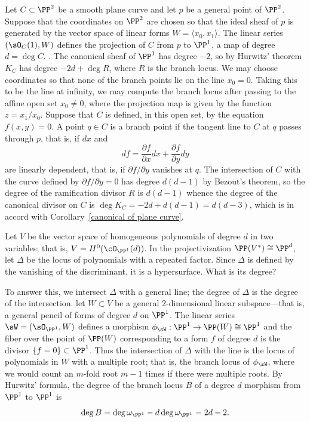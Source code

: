 \begin{example}
Let $C\subset \PP^2$ be a smooth plane curve and let $p$ be a general point of $\PP^2$. Suppose that the coordinates on $\PP^2$ are chosen so that the ideal sheaf of $p$ is  
 generated by the vector space of linear forms $W = \langle x_0,x_1\rangle$. 
The linear series $(\sO_C(1), W)$ defines the projection of $C$ from $p$ to $\PP^1$, a map of degree
$d = \deg C$.
. The canonical sheaf of $\PP^1$ has degree $-2$, so by Hurwitz' theorem
$K_C$ has degree $ -2d+ \deg R$, where $R$ is the branch locus. We may choose coordinates
so that none of the branch points lie on the line $x_0 = 0$. Taking this to be the line at infinity, we
may compute the branch locus after passing to the affine open set $x_0\neq 0$, where the projection
map is given by the function $z = x_1/x_0$.  Suppose that $C$ is defined, in this open set,
by the equation $f(x,y)= 0$. A point $q\in C$ is a branch point if the tangent line to $C$ at $q$
passes through $p$, that is, if $dx$  and 
$$
df = \frac{\partial f}{\partial x} dx + \frac{\partial f}{\partial y} dy
$$
are linearly dependent, that is, if $\partial f/{\partial y}$ vanishes at $q$. The intersection of 
$C$ with the curve defined by $\partial f/{\partial y}=0$ has degree $d(d-1)$ by Bezout's theorem,
so the degree of the ramification divisor $R$ is $d(d-1)$ whence the degree of the canonical
divisor on $C$ is $\deg K_C = -2d+d(d-1) = d(d-3)$, which is in accord with 
Corollary~\ref{canonical of plane curve}.

\end{example}

\begin{example}
 Let $V$ be the vector space of homogeneous polynomials of degree $d$ in two variables; that is, $V = H^0(\cO_{\PP^1}(d))$. In the projectivization $\PP(V^{*}) \cong \PP^d$, let $\Delta$ be the locus of polynomials with a repeated factor. Since $\Delta$ is defined by the vanishing of the discriminant, it is a hypersurface. What is its degree?
 
 To answer this, we intersect $\Delta$ with a general line; the degree of $\Delta$ is the degree of the intersection.  let $W\subset V$ be a general 2-dimensional linear subspace---that is, a general pencil of forms of degree $d$ on $\PP^1$. The linear series $\sW = (\sO_{\PP^{1}}, W)$ defines a morphism $\phi_{\sW} : \PP^{1} \to \PP(W) \cong \PP^{1}$ and the fiber over the point of $\PP(W)$ corresponding to a form $f$ of degree $d$ is the divisor $\{f = 0\}\subset \PP^{1}$. Thus the intersection of $\Delta$ with the line is the locus of polynomials in $W$ with a multiple root; that is, the branch locus of $\phi_{\sW}$, where we would count an $m$-fold root $m-1$ times if there were multiple roots.
 By Hurwitz' formula, the degree of the branch locus $B$ of a degree $d$ morphism from $\PP^{1}$ to $\PP^{1}$ is
 $$
 \deg B = \deg \omega_{\PP^{1}} - d\deg \omega_{\PP^{1}} = 2d-2.
 $$
 \end{example}
  

